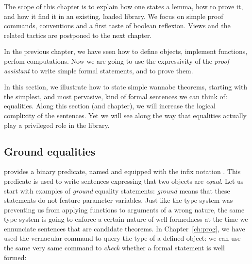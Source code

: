 
The scope of this chapter is to explain how one states a lemma,
how to prove it, and how it find it in an existing, loaded library.
We focus on simple proof commands, conventions and a first taste of
boolean reflexion. Views and the related tactics are postponed to the
next chapter.

\mcbREQUIRE{}


In the previous chapter, we have seen how to define objects, implement
functions, perfom computations. Now we are going to use the
expressivity of the \emph{proof assistant} to write simple formal
statements, and to prove them.


In this section, we illustrate how to state simple wannabe theorems,
starting with the simplest, and most pervasive, kind of formal
sentences we can think of: equalities. Along this section (and
chapter), we will increase the logical complixity of the
sentences. Yet we will see along the way that equalities actually play
a privileged role in the \mcbMC{} library.

\subsection{Ground equalities}\label{ssec:groundeq}

\Coq{} provides a binary predicate, named  and equipped with the
infix notation \C{=}. This predicate is used to write sentences
expressing that two objects are \emph{equal}. Let us start with
examples of \emph{ground} equality statements: \emph{ground} means
that these statements do not feature parameter variables.
Just like the type system was preventing
us from applying functions to arguments of a wrong nature, the same
type system is going to enforce a certain nature of well-formedness at
the time we ennunciate sentences that are candidate theorems.
In Chapter~\ref{ch:prog}, we have used the 
vernacular command to query the type of a defined object: we can use
the same very same command to \emph{check} whether a formal statement
is well formed:



